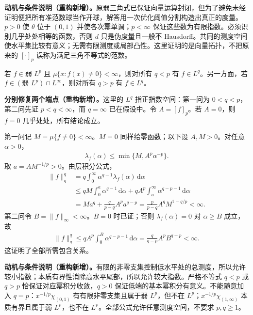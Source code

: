 \documentclass[../../main.tex]{subfiles}
\begin{document}
\begin{remark}
\textbf{动机与条件说明（重构新增）。}原弱三角式已保证向量运算封闭，但为了避免未经证明便把所有准范数球当作开球，解答用一次优化阈值分割构造出真正的度量。$p>0$ 使 $\theta$ 位于 $(0,1)$ 并使各次幂单调；$p<\infty$ 保证这些数为有限指数。必须识别几乎处处相等的函数，否则 $d$ 只是伪度量且一般不 Hausdorff。共同的测度空间使水平集比较有意义；无需有限测度或局部凸性。这里证明的是向量拓扑，不把原来的 $[\cdot]_p$ 误称为满足三角不等式的范数。
\end{remark}
\begin{exercise}\label{exercise:ch06-weak-strong-inclusions}
若 $f\in\text{弱 }L^p$ 且 $\mu\{x:f(x)\ne0\}<\infty$，则对所有 $q<p$ 有 $f\in L^q$。另一方面，若 $f\in(\text{弱 }L^p)\cap L^\infty$，则对所有 $q>p$ 有 $f\in L^q$。
\end{exercise}
\begin{solution}
\textbf{分别修复两个端点（重构新增）。}这里的 $L^q$ 指正指数空间：第一问为 $0<q<p$，第二问先证 $p<q<\infty$，而 $q=\infty$ 已在假设中。令 $A=[f]_p$。若 $A=0$，则 $f=0$ 几乎处处，所有结论成立。

第一问记 $M=\mu\{f\ne0\}<\infty$。$M=0$ 同样给零函数；以下设 $A,M>0$。对任意 $\alpha>0$，
\begin{align*}
\lambda_f(\alpha)\leqslant\min\{M,A^p\alpha^{-p}\}.
\end{align*}
取 $a=AM^{-1/p}>0$。由层积分公式，
\begin{align*}
\|f\|_q^q
&=q\int_0^\infty\alpha^{q-1}\lambda_f(\alpha)\,\mathrm d\alpha\\
&\leqslant qM\int_0^a\alpha^{q-1}\,\mathrm d\alpha
+qA^p\int_a^\infty\alpha^{q-p-1}\,\mathrm d\alpha\\
&=Ma^q+\frac q{p-q}A^pa^{q-p}
=\frac p{p-q}A^qM^{1-q/p}<\infty.
\end{align*}
第二问令 $B=\|f\|_\infty<\infty$。$B=0$ 时已证；否则 $\lambda_f(\alpha)=0$ 对 $\alpha\geqslant B$ 成立，故
\begin{align*}
\|f\|_q^q\leqslant qA^p\int_0^B\alpha^{q-p-1}\,\mathrm d\alpha
=\frac q{q-p}A^pB^{q-p}<\infty.
\end{align*}
这证明了全部所需包含关系。
\end{solution}
\begin{remark}
\textbf{动机与条件说明（重构新增）。}有限的非零支集控制低水平处的总测度，所以允许较小指数；本质有界性消除高水平尾部，所以允许较大指数。严格不等式 $q<p$ 或 $q>p$ 恰保证对应幂积分收敛，$q>0$ 保证低端的基本幂积分有意义。不能随意加入 $q=p$：$x^{-1/p}\chi_{(0,1)}$ 有有限非零支集且属于弱 $L^p$，但不在 $L^p$；$x^{-1/p}\chi_{(1,\infty)}$ 本质有界且属于弱 $L^p$，也不在 $L^p$。全部公式允许任意测度空间，不要求 $p,q\geqslant1$。
\end{remark}
\end{document}
